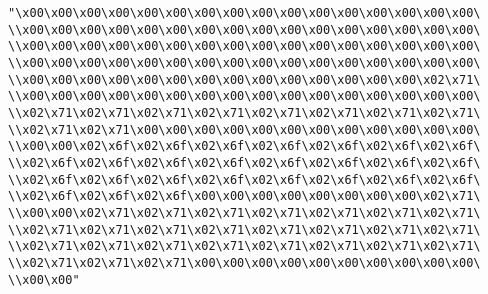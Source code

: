 \verb|"\x00\x00\x00\x00\x00\x00\x00\x00\x00\x00\x00\x00\x00\x00\x00\x00\|\newline
\verb|\\x00\x00\x00\x00\x00\x00\x00\x00\x00\x00\x00\x00\x00\x00\x00\x00\|\newline
\verb|\\x00\x00\x00\x00\x00\x00\x00\x00\x00\x00\x00\x00\x00\x00\x00\x00\|\newline
\verb|\\x00\x00\x00\x00\x00\x00\x00\x00\x00\x00\x00\x00\x00\x00\x00\x00\|\newline
\verb|\\x00\x00\x00\x00\x00\x00\x00\x00\x00\x00\x00\x00\x00\x00\x02\x71\|\newline
\verb|\\x00\x00\x00\x00\x00\x00\x00\x00\x00\x00\x00\x00\x00\x00\x00\x00\|\newline
\verb|\\x02\x71\x02\x71\x02\x71\x02\x71\x02\x71\x02\x71\x02\x71\x02\x71\|\newline
\verb|\\x02\x71\x02\x71\x00\x00\x00\x00\x00\x00\x00\x00\x00\x00\x00\x00\|\newline
\verb|\\x00\x00\x02\x6f\x02\x6f\x02\x6f\x02\x6f\x02\x6f\x02\x6f\x02\x6f\|\newline
\verb|\\x02\x6f\x02\x6f\x02\x6f\x02\x6f\x02\x6f\x02\x6f\x02\x6f\x02\x6f\|\newline
\verb|\\x02\x6f\x02\x6f\x02\x6f\x02\x6f\x02\x6f\x02\x6f\x02\x6f\x02\x6f\|\newline
\verb|\\x02\x6f\x02\x6f\x02\x6f\x00\x00\x00\x00\x00\x00\x00\x00\x02\x71\|\newline
\verb|\\x00\x00\x02\x71\x02\x71\x02\x71\x02\x71\x02\x71\x02\x71\x02\x71\|\newline
\verb|\\x02\x71\x02\x71\x02\x71\x02\x71\x02\x71\x02\x71\x02\x71\x02\x71\|\newline
\verb|\\x02\x71\x02\x71\x02\x71\x02\x71\x02\x71\x02\x71\x02\x71\x02\x71\|\newline
\verb|\\x02\x71\x02\x71\x02\x71\x00\x00\x00\x00\x00\x00\x00\x00\x00\x00\|\newline
\verb|\\x00\x00"|\newline
